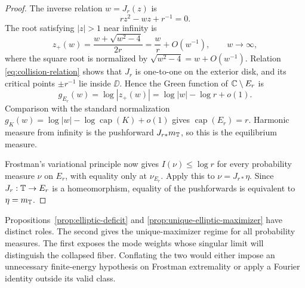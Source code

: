 \begin{proof}
The inverse relation \(w=J_r(z)\) is
\[
 rz^2-wz+r^{-1}=0.
\]
The root satisfying \(|z|>1\) near infinity is
\[
 z_+(w)=\frac{w+\sqrt{w^2-4}}{2r}
 =\frac{w}{r}+O(w^{-1}),\qquad w\to\infty,
\]
where the square root is normalized by
\(\sqrt{w^2-4}=w+O(w^{-1})\).  Relation
\eqref{eq:collision-relation} shows that \(J_r\) is one-to-one on the
exterior disk, and its critical points \(\pm r^{-1}\) lie inside
\(\DD\).  Hence the Green function of \(\mathbb{C}\setminus E_r\) is
\[
 g_{E_r}(w)=\log|z_+(w)|
 =\log|w|-\log r+o(1).
\]
Comparison with the standard normalization
\(g_K(w)=\log|w|-\log\operatorname{cap}(K)+o(1)\) gives
\(\operatorname{cap}(E_r)=r\).  Harmonic measure from infinity is the
pushforward \(J_{r\ast}m_{\mathbb{T}}\), so this is the equilibrium measure.

Frostman's variational principle now gives
\(I(\nu)\leq\log r\) for every probability measure \(\nu\) on
\(E_r\), with equality only at \(\nu_{E_r}\).  Apply this to
\(\nu=J_{r\ast}\eta\).  Since \(J_r:\mathbb{T}\to E_r\) is a
homeomorphism, equality of the pushforwards is equivalent to
\(\eta=m_{\mathbb{T}}\).
\end{proof}

Propositions~\ref{prop:elliptic-deficit} and
\ref{prop:unique-elliptic-maximizer} have distinct roles.  The second
gives the unique-maximizer regime for all probability measures.  The
first exposes the mode weights whose singular limit will distinguish
the collapsed fiber.  Conflating the two would either impose an
unnecessary finite-energy hypothesis on Frostman extremality or apply a
Fourier identity outside its valid class.
